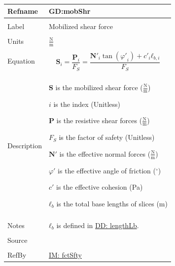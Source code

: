 \documentclass[12pt]{article}
\begin{document}
\noindent \begin{minipage}{\textwidth}
          \begin{tabular}{>{\raggedright}p{}>{\raggedright\arraybackslash}p{}}
          \toprule \textbf{Refname} & \textbf{GD:mobShr}
          \label{GD:mobShr}
          \\ \midrule \\
          Label & Mobilized shear force
          \\ \midrule \\
          Units & $\frac{\text{N}}{\text{m}}$
          \\ \midrule \\
          Equation & \begin{displaymath}
                     {\mathbf{S}}_{i}=\frac{{\mathbf{P}}_{i}}{{F_{S}}}=\frac{{\mathbf{N'}}_{i} \tan\left({φ'}_{i}\right)+{c'}_{i} {\mathbf{ℓ}_{b,i}}}{{F_{S}}}
                     \end{displaymath}
          \\ \midrule \\
          Description & \begin{symbDescription}
                        \item{$\mathbf{S}$ is the mobilized shear force ($\frac{\text{N}}{\text{m}}$)}
                        \item{$i$ is the index (Unitless)}
                        \item{$\mathbf{P}$ is the resistive shear forces ($\frac{\text{N}}{\text{m}}$)}
                        \item{${F_{S}}$ is the factor of safety (Unitless)}
                        \item{$\mathbf{N'}$ is the effective normal forces ($\frac{\text{N}}{\text{m}}$)}
                        \item{$φ'$ is the effective angle of friction (${}^{\circ}$)}
                        \item{$c'$ is the effective cohesion (Pa)}
                        \item{${\mathbf{ℓ}_{b}}$ is the total base lengths of slices (m)}
                        \end{symbDescription}
          \\ \midrule \\
          Notes & ${\mathbf{ℓ}_{b}}$ is defined in \hyperref[DD:lengthLb]{DD: lengthLb}.
          \\ \midrule \\
          Source & \cite{chen2005}
          \\ \midrule \\
          RefBy & \hyperref[IM:fctSfty]{IM: fctSfty}
          \\ \bottomrule
          \end{tabular}
          \end{minipage}
\end{document}
